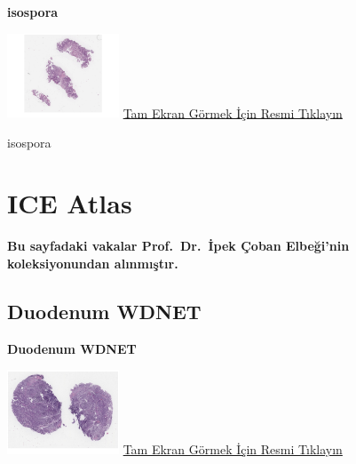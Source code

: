 \documentclass[
  letterpaper,
  DIV=11,
  numbers=noendperiod]{scrreprt}
\begin{document}
\textbf{isospora}

\href{https://images.patolojiatlasi.com/BS32/HE2.html}{\includegraphics[width=0.25\textwidth,height=\textheight]{./screenshots/thumbnail_BS32-HE2.png}}
\href{https://images.patolojiatlasi.com/BS32/HE2.html}{Tam Ekran Görmek
İçin Resmi Tıklayın}

\begin{tcolorbox}[enhanced jigsaw, colbacktitle=quarto-callout-tip-color!10!white, colback=white, titlerule=0mm, opacityback=0, colframe=quarto-callout-tip-color-frame, opacitybacktitle=0.6, bottomrule=.15mm, breakable, coltitle=black, title=\textcolor{quarto-callout-tip-color}{\faLightbulb}\hspace{0.5em}{Tanı}, toprule=.15mm, toptitle=1mm, bottomtitle=1mm, arc=.35mm, rightrule=.15mm, leftrule=.75mm, left=2mm]

isospora

\end{tcolorbox}

\hypertarget{ice-atlas}{%
\chapter{ICE Atlas}\label{ice-atlas}}

\textbf{Bu sayfadaki vakalar Prof.~Dr.~İpek Çoban Elbeği'nin
koleksiyonundan alınmıştır.}

\hypertarget{sec-ICE1-WDNET-duodenum}{%
\section{Duodenum WDNET}\label{sec-ICE1-WDNET-duodenum}}

\textbf{Duodenum WDNET}

\href{https://images.patolojiatlasi.com/ICE1-WDNET-duodenum/HE.html}{\includegraphics[width=0.25\textwidth,height=\textheight]{./screenshots/thumbnail_ICE1-WDNET-duodenum-HE.png}}
\href{https://images.patolojiatlasi.com/ICE1-WDNET-duodenum/HE.html}{Tam
Ekran Görmek İçin Resmi Tıklayın}
\end{document}
